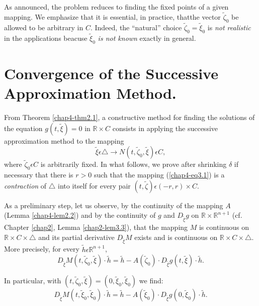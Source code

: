 \begin{remark}\label{chap4-rem2.2}
As announced, the problem reduces to finding the fixed points of a
given mapping. We emphasize that it is essential, in practice,
that\pageoriginale the vector $\widetilde{\zeta}_{0}$ be allowed to be
arbitrary in  $C$. Indeed, the ``natural'' choice $\widetilde{\zeta}_{0} =
\widetilde{\xi}_{0}$ is {\em not realistic} in the applications
beacuse $\widetilde{\xi}_{0}$ {\em is not known} exactly in general.
\end{remark}

\section{Convergence of the Successive Approximation
  Method.}\label{chap4-sec3}

From Theorem \ref{chap4-thm2.1}, a constructive method for finding the
solutions of the equation $g(t, \widetilde{\xi}) = 0$ in $\mathbb{R}
\times C$ consists in applying the successive approximation method to
the mapping
\begin{equation*}
\widetilde{\xi} \epsilon \triangle \to N(t, \widetilde{\zeta}_{0},
\widetilde{\xi}) \epsilon C,\tag{3.1}\label{chap4-eq3.1}
\end{equation*}
where $\widetilde{\zeta}_{0} \epsilon C$ is arbitrarily fixed. In what
follows, we prove after shrinking $\delta$ if necessary that there is
$r > 0$ such that the mapping (\ref{chap4-eq3.1}) is a {\em
  contraction} of $\triangle$ into itself for every pair $(t,
\widetilde{\zeta}) \epsilon (-r, r) \times C$.

As a preliminary step, let us observe, by the continuity of the
mapping $A$ (Lemma \ref{chap4-lem2.2}) and by the continuity of $g$ and
$D_{\widetilde{\xi}}g$ on $\mathbb{R} \times \mathbb{R}^{n+1}$
(cf. Chapter \ref{chap2}, Lemma \ref{chap2-lem3.3}), that the mapping
$M$ is continuous on $\mathbb{R} \times C \times \triangle$ and its
partial derivative $D_{\widetilde{\xi}}M$ exists and is continuous on
$\mathbb{R} \times C \times \triangle$. More precisely, for every
$\widetilde{h} \epsilon \mathbb{R}^{n+1}$, 
$$
D_{\widetilde{\xi}}M(t, \widetilde{\zeta}_{0}, \widetilde{\xi}) \cdot
\widetilde{h} = \widetilde{h} - A(\widetilde{\zeta}_{0}) \cdot
D_{\widetilde{\xi}}g(t, \widetilde{\xi}) \cdot \widetilde{h}.
$$

In particular, with $(t, \widetilde{\zeta}_{0}, \widetilde{\xi}) = (0,
\widetilde{\xi}_{0}, \widetilde{\xi}_{0})$ we find:
\begin{equation*}
D_{\widetilde{\xi}}M(t, \widetilde{\xi}_{0}, \widetilde{\xi}_{0})
\cdot \widetilde{h} = \widetilde{h} - A(\widetilde{\xi}_{0}) \cdot
D_{\widetilde{\xi}}g(0, \widetilde{\xi}_{0}) \cdot \widetilde{h}.\tag{3.2}\label{chap4-eq3.2}
\end{equation*}

